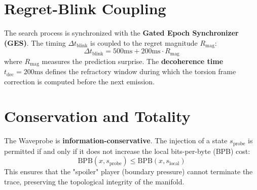 \documentclass[11pt,a4paper]{article}
\begin{document}
\section{Regret-Blink Coupling}

The search process is synchronized with the \textbf{Gated Epoch Synchronizer (GES)}. The timing $\Delta t_{\text{blink}}$ is coupled to the regret magnitude $R_{\text{mag}}$:
\begin{equation}
\Delta t_{\text{blink}} = 500\text{ms} + 200\text{ms} \cdot R_{\text{mag}}
\end{equation}
where $R_{\text{mag}}$ measures the prediction surprise. The \textbf{decoherence time} $t_{\text{dec}} = 200\text{ms}$ defines the refractory window during which the torsion frame correction is computed before the next emission.

\section{Conservation and Totality}

The Waveprobe is \textbf{information-conservative}. The injection of a state $s_{\text{probe}}$ is permitted if and only if it does not increase the local bits-per-byte (BPB) cost:
\begin{equation}
\text{BPB}(x, s_{\text{probe}}) \leq \text{BPB}(x, s_{\text{local}})
\end{equation}
This ensures that the "spoiler" player (boundary pressure) cannot terminate the trace, preserving the topological integrity of the manifold.
\end{document}
